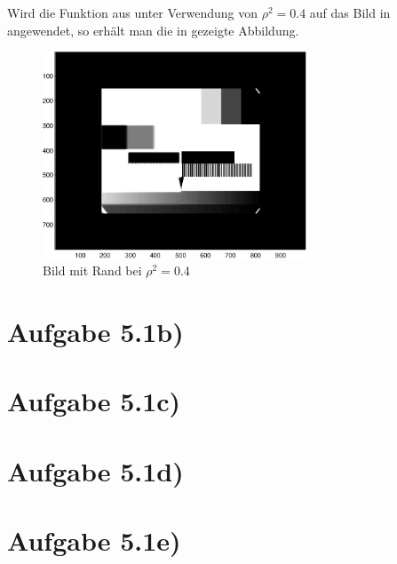 Wird die Funktion aus  unter Verwendung von $ρ^2 = 0.4$ auf das
Bild in  angewendet, so erhält man die in  gezeigte Abbildung.

\begin{figure}[htb]
\centering
  \includegraphics[width=0.7\textwidth,keepaspectratio]{../tmp/eins_a-crop.pdf}
  \caption{Bild mit Rand bei $ρ^2 = 0.4$}
  \label{fig:1a}
\end{figure}

\section*{Aufgabe 5.1b)}
\section*{Aufgabe 5.1c)}
\section*{Aufgabe 5.1d)}
\section*{Aufgabe 5.1e)}
